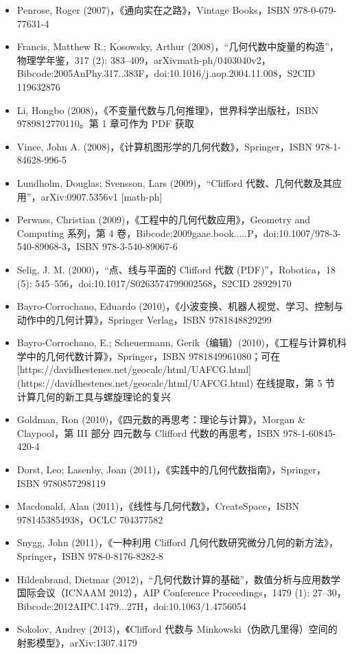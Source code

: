 \begin{itemize}
\item Penrose, Roger (2007)，《通向实在之路》，Vintage Books，ISBN 978-0-679-77631-4
\item Francis, Matthew R.; Kosowsky, Arthur (2008)，“几何代数中旋量的构造”，物理学年鉴，317 (2): 383–409，arXiv\:math-ph/0403040v2，Bibcode:2005AnPhy.317..383F，doi:10.1016/j.aop.2004.11.008，S2CID 119632876
\item Li, Hongbo (2008)，《不变量代数与几何推理》，世界科学出版社，ISBN 9789812770110。第 1 章可作为 PDF 获取
\item Vince, John A. (2008)，《计算机图形学的几何代数》，Springer，ISBN 978-1-84628-996-5
\item Lundholm, Douglas; Svensson, Lars (2009)，“Clifford 代数、几何代数及其应用”，arXiv:0907.5356v1 [math-ph]
\item Perwass, Christian (2009)，《工程中的几何代数应用》，Geometry and Computing 系列，第 4 卷，Bibcode:2009gaae.book.....P，doi:10.1007/978-3-540-89068-3，ISBN 978-3-540-89067-6
\item Selig, J. M. (2000)，“点、线与平面的 Clifford 代数 (PDF)”，Robotica，18 (5): 545–556，doi:10.1017/S0263574799002568，S2CID 28929170
\item Bayro-Corrochano, Eduardo (2010)，《小波变换、机器人视觉、学习、控制与动作中的几何计算》，Springer Verlag，ISBN 9781848829299
\item Bayro-Corrochano, E.; Scheuermann, Gerik（编辑）(2010)，《工程与计算机科学中的几何代数计算》，Springer，ISBN 9781849961080；可在 [https://davidhestenes.net/geocalc/html/UAFCG.html](https://davidhestenes.net/geocalc/html/UAFCG.html) 在线提取，第 5 节 计算几何的新工具与螺旋理论的复兴
\item Goldman, Ron (2010)，《四元数的再思考：理论与计算》，Morgan & Claypool，第 III 部分 四元数与 Clifford 代数的再思考，ISBN 978-1-60845-420-4
\item Dorst, Leo; Lasenby, Joan (2011)，《实践中的几何代数指南》，Springer，ISBN 9780857298119
\item Macdonald, Alan (2011)，《线性与几何代数》，CreateSpace，ISBN 9781453854938，OCLC 704377582
\item Snygg, John (2011)，《一种利用 Clifford 几何代数研究微分几何的新方法》，Springer，ISBN 978-0-8176-8282-8
\item Hildenbrand, Dietmar (2012)，“几何代数计算的基础”，数值分析与应用数学国际会议（ICNAAM 2012），AIP Conference Proceedings，1479 (1): 27–30，Bibcode:2012AIPC.1479...27H，doi:10.1063/1.4756054
\item Sokolov, Andrey (2013)，《Clifford 代数与 Minkowski（伪欧几里得）空间的射影模型》，arXiv:1307.4179

\end{itemize}
